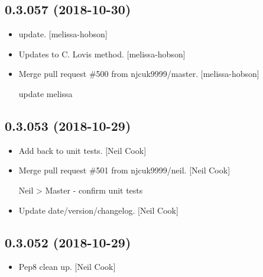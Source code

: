 \documentclass[a4paper,10pt,english]{report}
\begin{document}
\subsection{0.3.057 (2018-10-30)}
\label{\detokenize{misc/changelog:id277}}\begin{itemize}
\item {} 
 update. {[}melissa-hobson{]}

\item {} 
Updates to C. Lovis method. {[}melissa-hobson{]}

\item {} 
Merge pull request \#500 from njcuk9999/master. {[}melissa-hobson{]}

update melissa

\end{itemize}


\subsection{0.3.053 (2018-10-29)}
\label{\detokenize{misc/changelog:id278}}\begin{itemize}
\item {} 
Add  back to unit tests. {[}Neil Cook{]}

\item {} 
Merge pull request \#501 from njcuk9999/neil. {[}Neil Cook{]}

Neil \textendash{}\textgreater{} Master - confirm unit tests

\item {} 
Update date/version/changelog. {[}Neil Cook{]}

\end{itemize}


\subsection{0.3.052 (2018-10-29)}
\label{\detokenize{misc/changelog:id279}}\begin{itemize}
\item {} 
Pep8 clean up. {[}Neil Cook{]}

\end{itemize}
\end{document}
